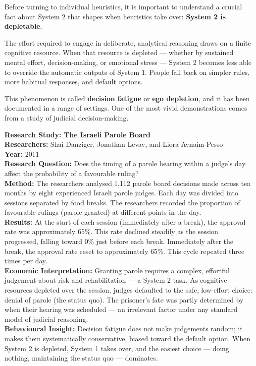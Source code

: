 \documentclass[12pt, letterpaper]{article}
\begin{document}
Before turning to individual heuristics, it is important to understand a crucial fact about System 2 that shapes when heuristics take over: \textbf{System 2 is depletable}.

The effort required to engage in deliberate, analytical reasoning draws on a finite cognitive resource. When that resource is depleted --- whether by sustained mental effort, decision-making, or emotional stress --- System 2 becomes less able to override the automatic outputs of System 1. People fall back on simpler rules, more habitual responses, and default options.

This phenomenon is called \textbf{decision fatigue} or \textbf{ego depletion}, and it has been documented in a range of settings. One of the most vivid demonstrations comes from a study of judicial decision-making.

\begin{researchbox}
\textbf{Research Study: The Israeli Parole Board}\\[4pt]

\textbf{Researchers:} Shai Danziger, Jonathan Levav, and Liora Avnaim-Pesso\\[4pt]
\textbf{Year:} 2011\\[4pt]
\textbf{Research Question:} Does the timing of a parole hearing within a judge's day affect the probability of a favourable ruling?\\[4pt]
\textbf{Method:} The researchers analysed 1,112 parole board decisions made across ten months by eight experienced Israeli parole judges. Each day was divided into sessions separated by food breaks. The researchers recorded the proportion of favourable rulings (parole granted) at different points in the day.\\[4pt]
\textbf{Results:} At the start of each session (immediately after a break), the approval rate was approximately 65\%. This rate declined steadily as the session progressed, falling toward 0\% just before each break. Immediately after the break, the approval rate reset to approximately 65\%. This cycle repeated three times per day.\\[4pt]
\textbf{Economic Interpretation:} Granting parole requires a complex, effortful judgement about risk and rehabilitation --- a System 2 task. As cognitive resources depleted over the session, judges defaulted to the safe, low-effort choice: denial of parole (the status quo). The prisoner's fate was partly determined by when their hearing was scheduled --- an irrelevant factor under any standard model of judicial reasoning.\\[4pt]
\textbf{Behavioural Insight:} Decision fatigue does not make judgements random; it makes them systematically conservative, biased toward the default option. When System 2 is depleted, System 1 takes over, and the easiest choice --- doing nothing, maintaining the status quo --- dominates.\\[4pt]
\end{researchbox}
\end{document}
